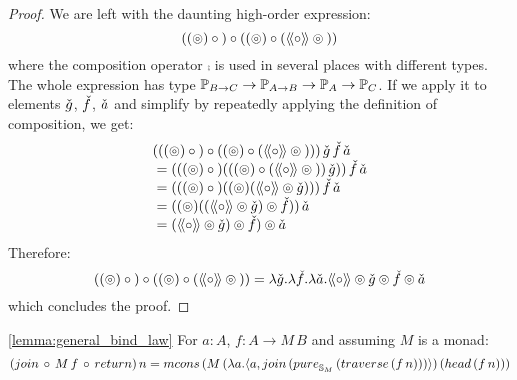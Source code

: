 \begin{proof}
We are left with the daunting high-order expression:
$$
((\circledcirc) \circ {}) \circ ((\circledcirc) \circ (\mathopen{\langle\!\langle}{\circ}\mathclose{\rangle\!\rangle} \circledcirc {}))
$$
where the composition operator $\comp$ is used in several places with different types.
The whole expression has type $\mathbb{P}_{B\rightarrow C}\rightarrow \mathbb{P}_{A\rightarrow B} \rightarrow \mathbb{P}_{A}\rightarrow \mathbb{P}_{C}$.
If we apply it to elements $\check{g}$, $\check{f}$, $\check{a}$ and simplify by repeatedly applying the definition of composition, we get:
$$
\begin{array}{l}
(((\pappl) \comp {}) \comp ((\pappl) \comp (\ppair{\comp} \pappl {})))\,
\pstr{g}\,\pstr{f}\,\pstr{a}\\
{}= (((\pappl) \comp {}) (((\pappl) \comp (\ppair{\comp} \pappl {}))\,\pstr{g}))\,
    \pstr{f}\,\pstr{a}\\
{}= (((\pappl) \comp {}) ((\pappl) (\ppair{\comp} \pappl\pstr{g})))\,
    \pstr{f}\,\pstr{a}\\
{}= ((\pappl) ((\ppair{\comp} \pappl\pstr{g}) \pappl \pstr{f}))\,\pstr{a}\\
{}= (\ppair{\comp} \pappl\pstr{g}) \pappl \pstr{f})\pappl\pstr{a}\\
\end{array}
$$
Therefore:
$$
((\circledcirc) \circ {}) \circ ((\circledcirc) \circ (\mathopen{\langle\!\langle}{\circ}\mathclose{\rangle\!\rangle} \circledcirc {}))
= \lambda \check{g}. \lambda \check{f}. \lambda \check{a}.
  \mathopen{\langle\!\langle}{\circ}\mathclose{\rangle\!\rangle} \circledcirc\check{g} \circledcirc \check{f} \circledcirc\check{a}
$$
which concludes the proof.
\end{proof}


\begin{lemmaa}{\ref{lemma:general_bind_law}}
For $a : A$, $f : A \rightarrow M\, B$ and assuming $M$ is a monad:
$$
(\join\, \comp\,  M\, f\, \comp\, \return)\, n = \mcons\, (M\,(\lambda a . \pair{a}{\join\, (\apure_{\stream{M}}\, (\mathsf{traverse}\, (f\, n)))})\, (\head\, (f\, n)))
$$
\end{lemmaa}

